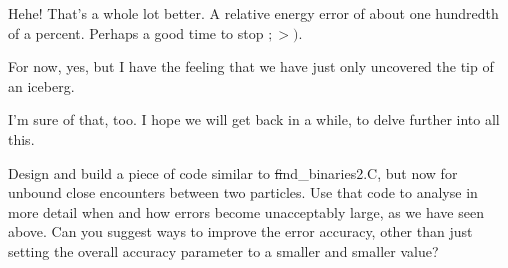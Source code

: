 \abc

\bob
Hehe!  That's a whole lot better.  A relative energy error of about
one hundredth of a percent.  Perhaps a good time to stop $;>)$.

\carol
For now, yes, but I have the feeling that we have just only uncovered
the tip of an iceberg.

\alice
I'm sure of that, too.  I hope we will get back in a while, to delve
further into all this.

\cba

\begin{Exercise}\label{ex:closeencounters}
Design and build a piece of code similar to {\st find\_binaries2.C},
but now for unbound close encounters between two particles.  Use that
code to analyse in more detail when and how errors become unacceptably
large, as we have seen above.  Can you suggest ways to improve the
error accuracy, other than just setting the overall accuracy parameter
to a smaller and smaller value?
\end{Exercise}
